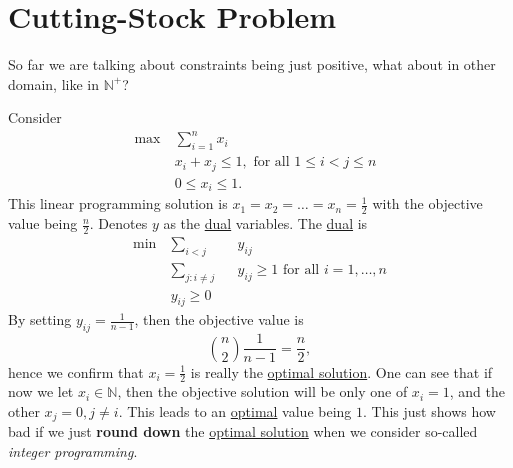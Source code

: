 \section{Cutting-Stock Problem}
So far we are talking about constraints being just positive, what about in other domain, like in \(\mathbb{N}^+\)?

Consider
\[
	\begin{aligned}
		\max~ & \sum\limits_{i=1}^{n} x_{i}                              \\
		      & x_{i}+x_{j}\leq 1, \text{ for all \(1\leq i< j\leq n\) } \\
		      & 0\leq x_{i}\leq 1.
	\end{aligned}
\]
This linear programming solution is \(x_1 = x_2 = \ldots  = x_n = \frac{1}{2}\) with the objective value being \(\frac{n}{2}\).
Denotes \(y\) as the \hyperref[def:dual]{dual} variables. The \hyperref[def:dual]{dual} is
\[
	\begin{alignedat}{3}
		\min~ & \sum\limits_{i<j}            && y_{ij}                                             \\
		& \sum\limits_{j\colon i\neq j} && y_{ij}\geq 1 \text{ for all \(i = 1, \ldots , n\)} \\
		& y_{ij}\geq 0
	\end{alignedat}
\]
By setting \(y_{ij} = \frac{1}{n-1}\), then the objective value is
\[
	\binom{n}{2}\frac{1}{n-1} = \frac{n}{2},
\]
hence we confirm that \(x_{i} = \frac{1}{2}\) is really the \hyperref[def:optimal-solution]{optimal solution}. One can see that if now we let \(x_{i}\in\mathbb{N}\), then
the objective solution will be only one of \(x_{i} = 1\), and the other \(x_{j} = 0, j\neq i\). This leads to an \hyperref[def:optimal-solution]{optimal} value being
\(1\). This just shows how bad if we just \textbf{round down} the \hyperref[def:optimal-solution]{optimal solution} when we consider so-called \emph{integer programming}.